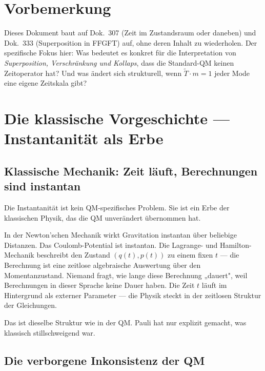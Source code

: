 
\section*{Vorbemerkung}

Dieses Dokument baut auf Dok.~307 (Zeit im Zustandsraum oder
daneben) und Dok.~333 (Superposition in FFGFT) auf, ohne deren
Inhalt zu wiederholen. Der spezifische Fokus hier: Was bedeutet
es konkret für die Interpretation von
\emph{Superposition, Verschränkung und Kollaps}, dass die
Standard-QM keinen Zeitoperator hat? Und was ändert sich
strukturell, wenn $\tilde{T}\cdot m=1$ jeder Mode eine eigene
Zeitskala gibt?

\section{Die klassische Vorgeschichte — Instantanität als Erbe}

\subsection{Klassische Mechanik: Zeit läuft, Berechnungen sind instantan}

Die Instantanität ist kein QM-spezifisches Problem. Sie ist ein
Erbe der klassischen Physik, das die QM unverändert übernommen hat.

In der Newton'schen Mechanik wirkt Gravitation instantan über
beliebige Distanzen. Das Coulomb-Potential ist instantan. Die
Lagrange- und Hamilton-Mechanik beschreibt den Zustand
$(q(t), p(t))$ zu einem fixen $t$ — die Berechnung ist eine
zeitlose algebraische Auswertung über den Momentanzustand.
Niemand fragt, wie lange diese Berechnung „dauert", weil
Berechnungen in dieser Sprache keine Dauer haben. Die Zeit
$t$ läuft im Hintergrund als externer Parameter — die Physik
steckt in der zeitlosen Struktur der Gleichungen.

Das ist dieselbe Struktur wie in der QM. Pauli hat nur
explizit gemacht, was klassisch stillschweigend war.

\subsection{Die verborgene Inkonsistenz der QM}


